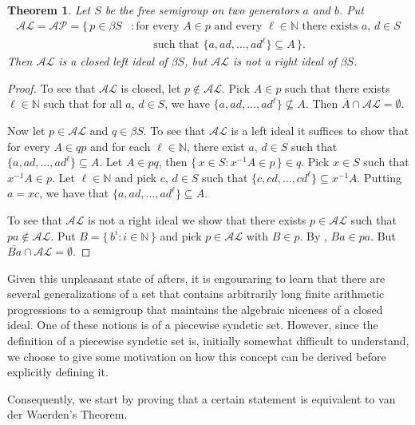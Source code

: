 \documentclass[12pt]{article}
\theoremstyle{plain}
\newtheorem{thm}{Theorem}[section]
\theoremstyle{definition}
\newcommand{\bbN}{\mathbb{N}}
\newcommand{\AP}{\mathcal{AP}}
\newcommand{\AL}{\mathcal{AL}}
\begin{document}
\begin{thm}
  Let $S$ be the free semigroup on two generators $a$ and $b$. 
  Put
  \begin{align*}
    \AL = \AP = \{\, p \in \beta S &: \mbox{for every $A \in p$ and every $\ell \in \bbN$ there exists $a$, $d\in S$} \\
    &\hspace{2em}\mbox{such that $\{a, ad, \ldots, ad^\ell\} \subseteq A$} \,\}.
  \end{align*}
  Then $\AL$ is a closed left ideal of $\beta S$, but $\AL$ is not a right ideal of $\beta S$.
\end{thm}
\begin{proof}
  To see that $\AL$ is closed, let $p \not\in \AL$.
  Pick $A \in p$ such that there exists $\ell \in \bbN$ such that for all $a$, $d \in S$, we have $\{a, ad, \ldots, ad^\ell\} \not\subseteq A$.
  Then $\overline{A} \cap \AL = \emptyset$.

  Now let $p \in \AL$ and $q \in \beta S$.
  To see that $\AL$ is a left ideal it suffices to show that for every $A \in qp$ and for each $\ell \in \bbN$, there exist $a$, $d \in S$ such that $\{a, ad, \ldots, ad^\ell\} \subseteq A$.
  Let $A \in pq$, then $\{\,x \in S : x^{-1}A \in p\,\} \in q$. 
  Pick $x \in S$ such that $x^{-1}A \in p$.
  Let $\ell \in \bbN$ and pick $c$, $d \in S$ such that $\{c, cd, \ldots, cd^\ell\} \subseteq x^{-1}A$.
  Putting $a = xc$, we have that $\{a, ad, \ldots, ad^\ell\} \subseteq A$.

  To see that $\AL$ is not a right ideal we show that there exists $p \in \AL$ such that $pa \not\in \AL$. 
  Put $B = \{\, b^i : i \in \bbN \,\}$ and pick $p \in \AL$ with $B \in p$. 
  By \cite[Exercise 4.1.8(b)]{Hindman:1998fk}, $Ba \in pa$.
  But $\overline{Ba} \cap \AL = \emptyset$.
\end{proof}

Given this unpleasant state of afters, it is engouraring to learn that there are several generalizations of a set that contains arbitrarily long finite arithmetic progressions to a semigroup that maintains the algebraic niceness of a closed ideal.
One of these notions is of a piecewise syndetic set.
However, since the definition of a piecewise syndetic set is, initially somewhat difficult to understand, we choose to give some motivation on how this concept can be derived before explicitly defining it.

Consequently, we start by proving that a certain statement is equivalent to van der Waerden's Theorem.
\end{document}
